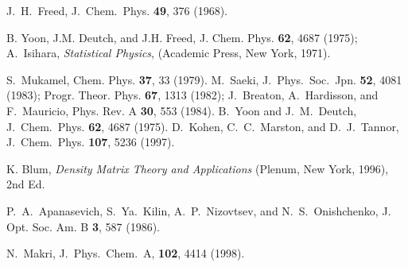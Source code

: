 \documentclass[12pt,twoside,a4paper]{report}
\begin{document}
{\begin{thebibliography}{999}
 J.~H.~Freed, J.~Chem.~Phys. {\bf 49},  376 (1968).

      B. Yoon, J.M. Deutch, and J.H. Freed, { J. Chem. Phys.}  
                  {\bf 62}, 4687 (1975);
                  A.~Isihara, {\it Statistical Physics},
                  (Academic Press, New York, 1971).








 S.~Mukamel, Chem. Phys. {\bf 37}, 33 (1979).
 M.~Saeki, J.~Phys.~Soc.~Jpn. {\bf 52}, 4081 (1983);
                 Progr. Theor. Phys. {\bf 67}, 1313 (1982);
                 J.~Breaton, A.~Hardisson, and F.~Mauricio, 
                 Phys. Rev. A {\bf 30}, 553 (1984).
 B.~Yoon and J.~M.~Deutch, 
                 J.~Chem.~Phys. {\bf 62}, 4687 (1975).
 D.~Kohen, C.~C.~Marston, and D.~J.~Tannor,
                 J.~Chem.~Phys. {\bf 107}, 5236 (1997).

  K. Blum, {\it Density Matrix Theory and Applications}   (Plenum, New York, 1996), 2nd Ed.\


     P.~A.~Apanasevich, S.~Ya.~Kilin, A.~P.~Nizovtsev,
                  and N.~S.~Onishchenko, { J. Opt. Soc. Am. B} {\bf 3}, 587 (1986).






 N.~Makri, J.~Phys.~Chem.~A, {\bf 102}, 4414 (1998).






\end{thebibliography}}
\end{document}
